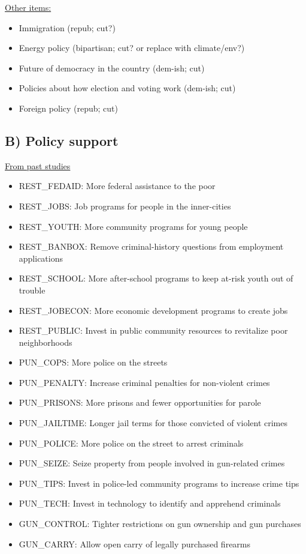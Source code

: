 \documentclass[
]{book}
\providecommand{\tightlist}{%
  \setlength{\itemsep}{0pt}\setlength{\parskip}{0pt}}
\begin{document}
\uline{Other items:}

\begin{itemize}
\tightlist
\item
  Immigration (repub; cut?)
\item
  Energy policy (bipartisan; cut? or replace with climate/env?)
\item
  Future of democracy in the country (dem-ish; cut)
\item
  Policies about how election and voting work (dem-ish; cut)
\item
  Foreign policy (repub; cut)
\end{itemize}

\hypertarget{b-policy-support}{%
\subsection{B) Policy support}\label{b-policy-support}}

\uline{From past studies}

\begin{itemize}
\item
  REST\_FEDAID: More federal assistance to the poor\\
\item
  REST\_JOBS: Job programs for people in the inner-cities
\item
  REST\_YOUTH: More community programs for young people
\item
  REST\_BANBOX: Remove criminal-history questions from employment applications
\item
  REST\_SCHOOL: More after-school programs to keep at-risk youth out of trouble
\item
  REST\_JOBECON: More economic development programs to create jobs
\item
  REST\_PUBLIC: Invest in public community resources to revitalize poor neighborhoods
\item
  PUN\_COPS: More police on the streets
\item
  PUN\_PENALTY: Increase criminal penalties for non-violent crimes
\item
  PUN\_PRISONS: More prisons and fewer opportunities for parole
\item
  PUN\_JAILTIME: Longer jail terms for those convicted of violent crimes
\item
  PUN\_POLICE: More police on the street to arrest criminals
\item
  PUN\_SEIZE: Seize property from people involved in gun-related crimes
\item
  PUN\_TIPS: Invest in police-led community programs to increase crime tips
\item
  PUN\_TECH: Invest in technology to identify and apprehend criminals
\item
  GUN\_CONTROL: Tighter restrictions on gun ownership and gun purchases
\item
  GUN\_CARRY: Allow open carry of legally purchased firearms
\end{itemize}
\end{document}
